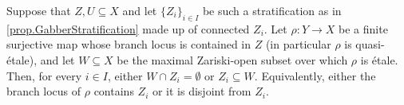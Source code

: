 \documentclass[12pt]{amsart}
\numberwithin{equation}{theorem}
\renewcommand{\:}{\colon}
\theoremstyle{theorem}
\def\todo#1{\textcolor{Mahogany}%
{\footnotesize\newline{\color{Mahogany}\fbox{\parbox{\textwidth-15pt}{\textbf{todo:
} #1}}}\newline}}
\begin{document}

\begin{proposition} \label{prop.StrataAndCovers}
Suppose that $Z, U \subseteq X$ and let $\{ Z_i \}_{i \in I}$ be such a stratification as in \autoref{prop.GabberStratification} made up of connected $Z_i$.
Let $\rho\colon Y \to X$ be a finite surjective map whose branch locus is contained in $Z$ (in particular $\rho$ is quasi-\'etale), and let $W \subseteq X$ be the maximal Zariski-open subset over which $\rho$ is \'etale.
Then, for every $i \in I$, either $W \cap Z_i = \emptyset$ or $Z_i \subseteq W$.
Equivalently, either the branch locus of $\rho$ contains $Z_i$ or it is disjoint from $Z_i$.
\end{proposition}
\end{document}
